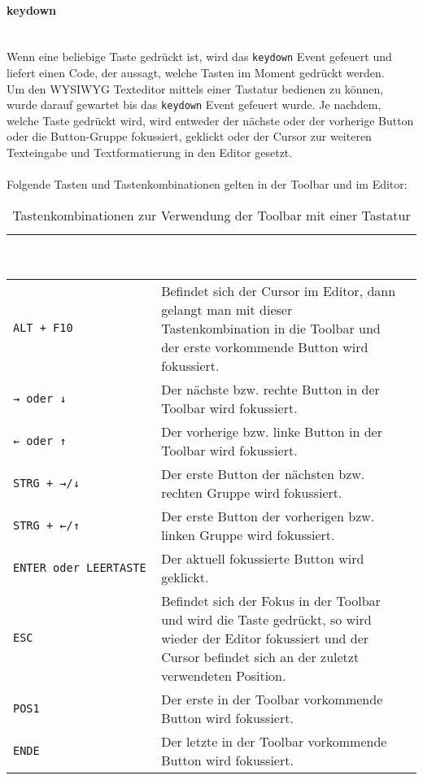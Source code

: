 \paragraph{keydown}\mbox{}\\
Wenn eine beliebige Taste gedrückt ist, wird das \texttt{keydown} Event gefeuert und liefert einen Code, der aussagt, welche Tasten im Moment gedrückt werden.\\
Um den WYSIWYG Texteditor mittels einer Tastatur bedienen zu können, wurde darauf gewartet bis das \texttt{keydown} Event gefeuert wurde. Je nachdem, welche Taste gedrückt wird, wird entweder der nächste oder der vorherige Button oder die Button-Gruppe fokussiert, geklickt oder der Cursor zur weiteren Texteingabe und Textformatierung in den Editor gesetzt.\\
\\Folgende Tasten und Tastenkombinationen gelten in der Toolbar und im Editor:

\begin{table}[H]
	\begin{center}
	\begin{tabular}{l|p{9cm}l}
		\hline
		\cellcolor{Gray}\textcolor{White}{Taste bzw. Tastenkombination} & \cellcolor{Gray}\textcolor{White}{Beschreibung} \\
		\hline
		\texttt{ALT + F10} & Befindet sich der Cursor im Editor, dann gelangt man mit dieser Tastenkombination in die Toolbar
		und der erste vorkommende Button wird fokussiert.\\
		\hline
		\texttt{→ oder ↓} & Der nächste bzw. rechte Button in der Toolbar wird fokussiert.\\
		\hline
		\texttt{← oder ↑} & Der vorherige bzw. linke Button in der Toolbar wird fokussiert.\\
		\hline
		\texttt{STRG + →/↓} & Der erste Button der nächsten bzw. rechten Gruppe wird fokussiert.\\
		\hline
		\texttt{STRG + ←/↑} & Der erste Button der vorherigen bzw. linken Gruppe wird fokussiert.\\
		\hline
		\texttt{ENTER oder LEERTASTE} & Der aktuell fokussierte Button wird geklickt.\\
		\hline
		\texttt{ESC} & Befindet sich der Fokus in der Toolbar und wird die Taste gedrückt, so wird wieder der Editor fokussiert
		und der Cursor befindet sich an der zuletzt verwendeten Position.\\
		\hline
		\texttt{POS1} & Der erste in der Toolbar vorkommende Button wird fokussiert.\\
		\hline
		\texttt{ENDE} & Der letzte in der Toolbar vorkommende Button wird fokussiert.\\
		\hline
	\end{tabular}
	\end{center}
	\caption{Tastenkombinationen zur Verwendung der Toolbar mit einer Tastatur}
\end{table}

